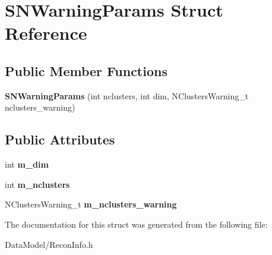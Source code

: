 \hypertarget{structSNWarningParams}{\section{S\-N\-Warning\-Params Struct Reference}
\label{structSNWarningParams}
}
\subsection*{Public Member Functions}
\begin{DoxyCompactItemize}
\item 
\hypertarget{structSNWarningParams_a08362f6e7b4010c81b511df679d38048}{{\bfseries S\-N\-Warning\-Params} (int nclusters, int dim, N\-Clusters\-Warning\-\_\-t nclusters\-\_\-warning)}\label{structSNWarningParams_a08362f6e7b4010c81b511df679d38048}

\end{DoxyCompactItemize}
\subsection*{Public Attributes}
\begin{DoxyCompactItemize}
\item 
\hypertarget{structSNWarningParams_adad4ce9981ee71145013e4c4e2016ff6}{int {\bfseries m\-\_\-dim}}\label{structSNWarningParams_adad4ce9981ee71145013e4c4e2016ff6}

\item 
\hypertarget{structSNWarningParams_ac39f2733df6abe5cde86faa3fe3e208f}{int {\bfseries m\-\_\-nclusters}}\label{structSNWarningParams_ac39f2733df6abe5cde86faa3fe3e208f}

\item 
\hypertarget{structSNWarningParams_a770c3bc2f109ce3e76363199218cfcf3}{N\-Clusters\-Warning\-\_\-t {\bfseries m\-\_\-nclusters\-\_\-warning}}\label{structSNWarningParams_a770c3bc2f109ce3e76363199218cfcf3}

\end{DoxyCompactItemize}


The documentation for this struct was generated from the following file\-:\begin{DoxyCompactItemize}
\item 
Data\-Model/Recon\-Info.\-h\end{DoxyCompactItemize}
